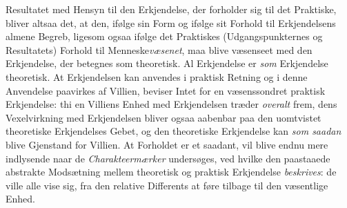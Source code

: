 Resultatet med Hensyn til den Erkjendelse, der forholder sig til det
Praktiske, bliver altsaa det, at den, ifølge sin Form og ifølge sit Forhold
til Erkjendelsens almene Begreb, ligesom ogsaa ifølge det Praktiskes
(Udgangspunkternes og Resultatets) Forhold til Menneske\emph{væsenet}, maa
blive væsenseet med den Erkjendelse, der betegnes som theoretisk. Al
Erkjendelse er \emph{som} Erkjendelse theoretisk. At Erkjendelsen kan anvendes
i praktisk Retning og i denne Anvendelse paavirkes af Villien, beviser Intet
for en væsenssondret praktisk Erkjendelse: thi en Villiens Enhed med
Erkjendelsen træder \emph{overalt} frem, dens Vexelvirkning med Erkjendelsen
bliver ogsaa aabenbar paa den uomtvistet theoretiske Erkjendelses Gebet, og
den theoretiske Erkjendelse kan \emph{som saadan} blive Gjenstand for Villien.
 At Forholdet er et saadant, vil blive endnu mere indlysende naar de
\emph{Charakteermærker} undersøges, ved hvilke den paastaaede abstrakte
Modsætning mellem theoretisk og praktisk Erkjendelse \emph{beskrives}: de
ville alle vise sig, fra den relative Differents at føre tilbage til den
væsentlige Enhed.

